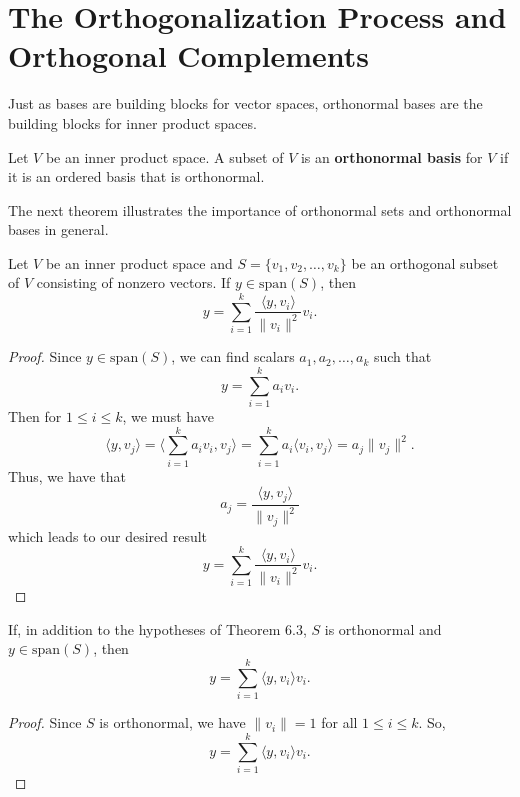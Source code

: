 \section{The Orthogonalization Process and Orthogonal Complements}

Just as bases are building blocks for vector spaces, orthonormal bases are the building blocks for inner product spaces.

\begin{definition}
   Let \( V  \) be an inner product space. A subset of \( V  \) is an \textbf{orthonormal basis} for \( V  \) if it is an ordered basis that is orthonormal. 
\end{definition}

The next theorem illustrates the importance of orthonormal sets and orthonormal bases in general.

\begin{theorem}
    Let \( V  \) be an inner product space and \( S = \{ {v}_{1}, {v}_{2}, \dots, {v}_{k } \}  \) be an orthogonal subset of \( V  \) consisting of nonzero vectors. If \( y \in \text{span}(S) \), then
    \[  y = \sum_{ i=1  }^{ k  } \frac{ \langle y , {v}_{i} \rangle }{ \|{v}_{i}\|^{2}  }  {v}_{i}. \]
\end{theorem}
\begin{proof}
Since \( y \in \text{span}(S) \), we can find scalars \( {a}_{1}, {a}_{2}, \dots, {a}_{k } \) such that
\[  y = \sum_{ i=1  }^{ k  }{a}_{i} {v}_{i}. \]
Then for \( 1 \leq i \leq k  \), we must have
\[  \langle y , {v}_{j} \rangle = \Big\langle \sum_{ i=1  }^{ k  } {a}_{i} {v}_{i} , {v}_{j} \Big\rangle  =\sum_{ i=1  }^{ k  } {a}_{i} \langle {v}_{i} , {v}_{j} \rangle = {a}_{j} \|{v}_{j}\|^{2}. \]
Thus, we have that
\[ {a}_{j} = \frac{ \langle y , {v}_{j} \rangle }{ \|{v}_{j}\|^{2} }  \]
which leads to our desired result 
\[  y = \sum_{ i=1  }^{ k  } \frac{ \langle y ,  {v}_{i} \rangle }{ \|{v}_{i}\|^{2} } {v}_{i}. \]
\end{proof}


\begin{corollary}
   If, in addition to the hypotheses of Theorem 6.3, \( S  \) is orthonormal and \( y \in \text{span}(S) \), then 
   \[  y = \sum_{ i=1  }^{ k  } \langle y , {v}_{i} \rangle {v}_{i}. \]
\end{corollary}

\begin{proof}
Since \( S  \) is orthonormal, we have \( \|{v}_{i}\| = 1  \) for all \( 1 \leq i \leq k  \). So,
\[  y = \sum_{ i=1  }^{ k  } \langle y , {v}_{i} \rangle {v}_{i}. \]
\end{proof}

